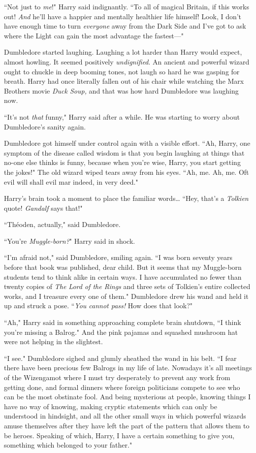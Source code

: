 ``Not just to \emph{me}!" Harry said indignantly. ``To all of magical Britain, if this works out! \emph{And} he'll have a happier and mentally healthier life himself! Look, I don't have enough time to turn \emph{everyone} away from the Dark Side and I've got to ask where the Light can gain the most advantage the fastest—"

Dumbledore started laughing. Laughing a lot harder than Harry would expect, almost howling. It seemed positively \emph{undignified}. An ancient and powerful wizard ought to chuckle in deep booming tones, not laugh so hard he was gasping for breath. Harry had once literally fallen out of his chair while watching the Marx Brothers movie \emph{Duck Soup,} and that was how hard Dumbledore was laughing now.

``It's not \emph{that} funny," Harry said after a while. He was starting to worry about Dumbledore's sanity again.

Dumbledore got himself under control again with a visible effort. ``Ah, Harry, one symptom of the disease called wisdom is that you begin laughing at things that no-one else thinks is funny, because when you're wise, Harry, you start getting the jokes!" The old wizard wiped tears away from his eyes. ``Ah, me. Ah, me. Oft evil will shall evil mar indeed, in very deed."

Harry's brain took a moment to place the familiar words{\ldots} ``Hey, that's a \emph{Tolkien} quote! \emph{Gandalf} says that!"

``Théoden, actually," said Dumbledore.

``You're \emph{Muggle-born?}" Harry said in shock.

``I'm afraid not," said Dumbledore, smiling again. ``I was born seventy years before that book was published, dear child. But it seems that my Muggle-born students tend to think alike in certain ways. I have accumulated no fewer than twenty copies of \emph{The Lord of the Rings} and three sets of Tolkien's entire collected works, and I treasure every one of them." Dumbledore drew his wand and held it up and struck a pose. ``\emph{You cannot pass!} How does that look?"

``Ah," Harry said in something approaching complete brain shutdown, ``I think you're missing a Balrog." And the pink pajamas and squashed mushroom hat were not helping in the slightest.

``I see." Dumbledore sighed and glumly sheathed the wand in his belt. ``I fear there have been precious few Balrogs in my life of late. Nowadays it's all meetings of the Wizengamot where I must try desperately to prevent any work from getting done, and formal dinners where foreign politicians compete to see who can be the most obstinate fool. And being mysterious at people, knowing things I have no way of knowing, making cryptic statements which can only be understood in hindsight, and all the other small ways in which powerful wizards amuse themselves after they have left the part of the pattern that allows them to be heroes. Speaking of which, Harry, I have a certain something to give you, something which belonged to your father."

